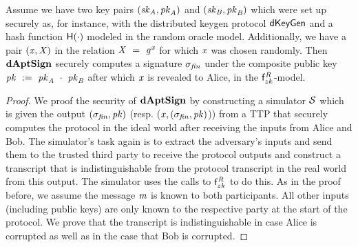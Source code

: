 \begin{theorem} \label{lem:sig:daptsign}
    Assume we have two key pairs $(\mathit{sk}_{\mathit{A}}, \mathit{pk}_{\mathit{A}})$ and $(\mathit{sk}_{\mathit{B}}, \mathit{pk}_{\mathit{B}})$ which were set up securely as, for instance, with the distributed keygen protocol $\mathsf{dKeyGen}$ and a hash function $\mathsf{H} (\cdot)$ modeled in the random oracle model.
    Additionally, we have a pair $(\mathit{x}, \mathit{X})$ in the relation $\mathit{X} ~=~ \mathit{g}^{\mathit{x}}$ for which $\mathit{x}$ was chosen randomly.
    Then $\mathbf{dAptSign}$ securely computes a signature $\sigma_{\mathit{fin}}$ under the composite public key $\mathit{pk} ~:=~ \mathit{pk}_{\mathit{A}} ~\cdot~ \mathit{pk}_{\mathit{B}}$ after which $\mathit{x}$ is revealed to Alice, in the $\mathsf{f}^{\mathit{R}}_{zk}$-model.
\end{theorem}

\begin{proof}
    We proof the security of $\mathbf{dAptSign}$ by constructing a simulator $\mathcal{S}$ which is given the output $(\sigma_{\mathit{fin}}, \mathit{pk})$ (resp. ($\mathit{x}, (\sigma_{\mathit{fin}}, \mathit{pk})$)) from a TTP that securely computes the protocol in the ideal world after receiving the inputs from Alice and Bob.
    The simulator's task again is to extract the adversary's inputs and send them to the trusted third party to receive the protocol outputs and construct a transcript that is indistinguishable from the protocol transcript in the real world from this output.
    The simulator uses the calls to $\mathsf{f}^{\mathit{R}}_{zk}$ to do this.
    As in the proof before, we assume the message $\mathit{m}$ is known to both participants.
    All other inputs (including public keys) are only known to the respective party at the start of the protocol.
    We prove that the transcript is indistinguishable in case Alice is corrupted as well as in the case that Bob is corrupted.


\end{proof}

